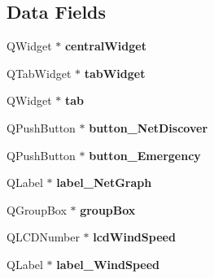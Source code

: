 \subsection*{Data Fields}
\begin{DoxyCompactItemize}
\item 
\mbox{\label{class_ui___main_window_a129e36c06062b79af53a6a6436aadb45}} 
Q\+Widget $\ast$ {\bfseries central\+Widget}
\item 
\mbox{\label{class_ui___main_window_ac9612c310b811caee11cfbcc44841b6f}} 
Q\+Tab\+Widget $\ast$ {\bfseries tab\+Widget}
\item 
\mbox{\label{class_ui___main_window_a81de2fb1bf7947bbca6cb4ecf22afc42}} 
Q\+Widget $\ast$ {\bfseries tab}
\item 
\mbox{\label{class_ui___main_window_ae51b4491138797d13475e64411690ecd}} 
Q\+Push\+Button $\ast$ {\bfseries button\+\_\+\+Net\+Discover}
\item 
\mbox{\label{class_ui___main_window_a89d728653ce9a29127d9912fad049ca5}} 
Q\+Push\+Button $\ast$ {\bfseries button\+\_\+\+Emergency}
\item 
\mbox{\label{class_ui___main_window_a03dc38a334cb56e90408f691dbe4092d}} 
Q\+Label $\ast$ {\bfseries label\+\_\+\+Net\+Graph}
\item 
\mbox{\label{class_ui___main_window_ac0b3b910d67fce72146affe13f5cc48f}} 
Q\+Group\+Box $\ast$ {\bfseries group\+Box}
\item 
\mbox{\label{class_ui___main_window_a3a69c18625162a8a19f6f061ff95729e}} 
Q\+L\+C\+D\+Number $\ast$ {\bfseries lcd\+Wind\+Speed}
\item 
\mbox{\label{class_ui___main_window_a9923bba0d8993f207ec4bc264d10eeaf}} 
Q\+Label $\ast$ {\bfseries label\+\_\+\+Wind\+Speed}
\item 
\mbox{\label{class_ui___main_window_a02dbb24c432f557256b2c61ca7de8b97}} 

\end{DoxyCompactItemize}
